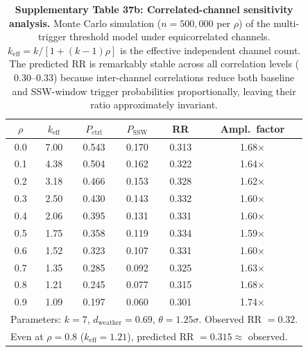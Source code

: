 \documentclass[11pt,letterpaper]{article}
\begin{document}
\begin{table}[h!]
\centering
\caption{\textbf{Supplementary Table 37b: Correlated-channel sensitivity analysis.} Monte Carlo simulation ($n = 500{,}000$ per $\rho$) of the multi-trigger threshold model under equicorrelated channels. $k_{\mathrm{eff}} = k / [1 + (k-1)\rho]$ is the effective independent channel count. The predicted RR is remarkably stable across all correlation levels ($0.30$--$0.33$) because inter-channel correlations reduce both baseline and SSW-window trigger probabilities proportionally, leaving their ratio approximately invariant.}
\label{tab:corr_sensitivity}
\begin{tabular}{cccccc}
\toprule
$\rho$ & $k_{\mathrm{eff}}$ & $P_{\mathrm{ctrl}}$ & $P_{\mathrm{SSW}}$ & RR & Ampl.\ factor \\
\midrule
0.0 & 7.00 & 0.543 & 0.170 & 0.313 & 1.68$\times$ \\
0.1 & 4.38 & 0.504 & 0.162 & 0.322 & 1.64$\times$ \\
0.2 & 3.18 & 0.466 & 0.153 & 0.328 & 1.62$\times$ \\
0.3 & 2.50 & 0.430 & 0.143 & 0.332 & 1.60$\times$ \\
0.4 & 2.06 & 0.395 & 0.131 & 0.331 & 1.60$\times$ \\
0.5 & 1.75 & 0.358 & 0.119 & 0.334 & 1.59$\times$ \\
0.6 & 1.52 & 0.323 & 0.107 & 0.331 & 1.60$\times$ \\
0.7 & 1.35 & 0.285 & 0.092 & 0.325 & 1.63$\times$ \\
0.8 & 1.21 & 0.245 & 0.077 & 0.315 & 1.68$\times$ \\
0.9 & 1.09 & 0.197 & 0.060 & 0.301 & 1.74$\times$ \\
\bottomrule
\multicolumn{6}{l}{\footnotesize Parameters: $k = 7$, $d_{\mathrm{weather}} = 0.69$, $\theta = 1.25\sigma$. Observed RR $= 0.32$.} \\
\multicolumn{6}{l}{\footnotesize Even at $\rho = 0.8$ ($k_{\mathrm{eff}} = 1.21$), predicted RR $= 0.315 \approx$ observed.} \\
\end{tabular}
\end{table}
\end{document}

